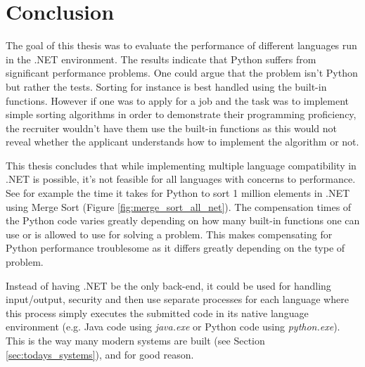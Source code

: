 \section{Conclusion}
The goal of this thesis was to evaluate the performance of different languages run in the .NET environment. The results indicate that Python suffers from significant performance problems. One could argue that the problem isn't Python but rather the tests. Sorting for instance is best handled using the built-in functions. However if one was to apply for a job and the task was to implement simple sorting algorithms in order to demonstrate their programming proficiency, the recruiter wouldn't have them use the built-in functions as this would not reveal whether the applicant understands how to implement the algorithm or not.

This thesis concludes that while implementing multiple language compatibility in .NET is possible, it's not feasible for all languages with concerns to performance. See for example the time it takes for Python to sort 1 million elements in .NET using Merge Sort (Figure \ref{fig:merge_sort_all_net}). The compensation times of the Python code varies greatly depending on how many built-in functions one can use or is allowed to use for solving a problem. This makes compensating for Python performance troublesome as it differs greatly depending on the type of problem.

Instead of having .NET be the only back-end, it could be used for handling input/output, security and then use separate processes for each language where this process simply executes the submitted code in its native language environment (e.g. Java code using \textit{java.exe} or Python code using \textit{python.exe}). This is the way many modern systems are built (see Section \ref{sec:todays_systems}), and for good reason.